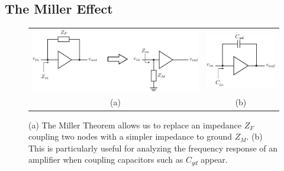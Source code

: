 \subsection{The Miller Effect}
\begin{figure}[tb]
\begin{center}
\begin{tabular}{cc}
\includegraphics[scale=.9]{miller2} &
\includegraphics[scale=.9]{miller_cap} \\
(a) & (b)  \\
\end{tabular}
\end{center}
\caption{(a) The Miller Theorem allows us to replace an impedance $Z_F$ coupling two nodes with a simpler impedance to ground $Z_M$.  (b) This is particularly useful for analyzing the frequency response of an amplifier when coupling capacitors such as $C_{gd}$ appear.}
\label{fig:miller1}
\end{figure}

